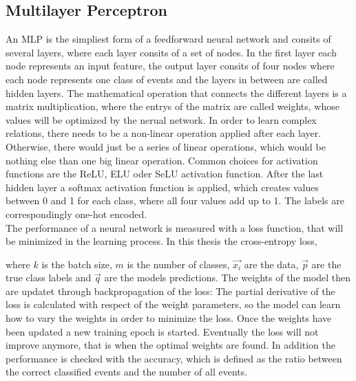 \label{sec:deepl}

\subsection{Multilayer Perceptron}
\label{sec:funcmlp}

An MLP is the simpliest form of a feedforward neural network and consits of several layers, where each layer consits of a set of nodes. In the first layer each node represents an input feature, the output layer consits of four nodes where each node represents one class of events
and the layers in between are called hidden layers. The mathematical operation that connects the different layers
is a matrix multiplication, where the entrys of the matrix are called weights, whose values will be optimized by the nerual network. In order to learn complex
relations, there needs to be a non-linear operation applied after each layer. Otherwise, there would just be a series of linear operations, which would be nothing else
than one big linear operation. Common choices for activation functions are the ReLU, ELU oder SeLU activation function. After the last hidden layer a softmax activation function is applied,
which creates values between 0 and 1 for each class, where all four values add up to 1. The labels are correspondingly one-hot encoded. \\

The performance of a neural network is measured with a loss function, that will be minimized in the learning process. In this thesis the cross-entropy loss, 


where $k$ is the batch size, $m$ is the number of classes, $\vec{x_i}$ are the data, $\vec{p}$ are the true class labels and $\vec{q}$ are the models predictions.
The weights of the model then are updatet through backpropagation of the loss: The partial derivative of the loss is calculated with respect of the weight parameters, so the model can learn how to
vary the weights in order to minimize the loss. Once the weights have been updated a new training epoch is started.
Eventually the loss will not improve anymore, that is when the optimal weights are found. In addition the performance is checked with the accuracy, which is
defined as the ratio between the correct classified events and the number of all events. \\

